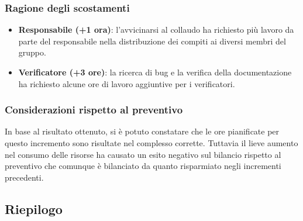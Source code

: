 \subsubsection{Ragione degli scostamenti}

\begin{itemize}
\item \textbf{Responsabile (+1 ora)}: l'avvicinarsi al collaudo ha richiesto più lavoro da parte del responsabile nella distribuzione dei compiti ai diversi membri del gruppo.
\item \textbf{Verificatore (+3 ore)}: la ricerca di bug e la verifica della documentazione ha richiesto alcune ore di lavoro aggiuntive per i verificatori.
\end{itemize}

\subsubsection{Considerazioni rispetto al preventivo}

In base al risultato ottenuto, si è potuto constatare che le ore pianificate per questo incremento sono risultate nel complesso corrette. Tuttavia il lieve aumento nel consumo delle risorse ha causato un esito negativo sul bilancio rispetto al preventivo che comunque è bilanciato da quanto risparmiato negli incrementi precedenti.\\

\newpage

\subsection{Riepilogo}


